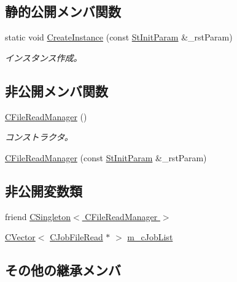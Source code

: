 \subsection*{静的公開メンバ関数}
\begin{DoxyCompactItemize}
\item 
static void \hyperlink{class_c_file_read_manager_a2be2641a242706bb410e976325a74665}{Create\+Instance} (const \hyperlink{struct_c_file_read_manager_1_1_st_init_param}{St\+Init\+Param} \&\+\_\+rst\+Param)
\begin{DoxyCompactList}\small\item\em インスタンス作成。 \end{DoxyCompactList}\end{DoxyCompactItemize}
\subsection*{非公開メンバ関数}
\begin{DoxyCompactItemize}
\item 
\hyperlink{class_c_file_read_manager_a3eafa43bdf03c4b3560900d952c6eb22}{C\+File\+Read\+Manager} ()
\begin{DoxyCompactList}\small\item\em コンストラクタ。 \end{DoxyCompactList}\item 
\hyperlink{class_c_file_read_manager_a75ad845bcfe35443ef29d2a2cfe843cd}{C\+File\+Read\+Manager} (const \hyperlink{struct_c_file_read_manager_1_1_st_init_param}{St\+Init\+Param} \&\+\_\+rst\+Param)
\end{DoxyCompactItemize}
\subsection*{非公開変数類}
\begin{DoxyCompactItemize}
\item 
friend \hyperlink{class_c_file_read_manager_a7a9788832ab00f7595c2782a849942e9}{C\+Singleton$<$ C\+File\+Read\+Manager $>$}
\item 
\hyperlink{_list_8h_af54c38acd8944230f18792ac38211526}{C\+Vector}$<$ \hyperlink{class_c_job_file_read}{C\+Job\+File\+Read} $\ast$ $>$ \hyperlink{class_c_file_read_manager_a06d2dd73e1e01a66e4072ecfe4507c54}{m\+\_\+c\+Job\+List}
\end{DoxyCompactItemize}
\subsection*{その他の継承メンバ}


